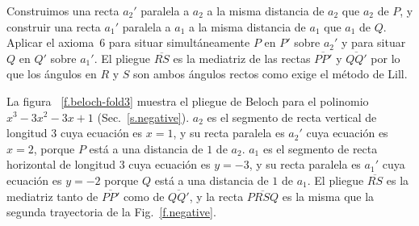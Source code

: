 Construimos una recta $a_2'$ paralela a $a_2$ a la misma distancia de $a_2$ que $a_2$ de $P$, y construir una recta $a_1'$ paralela a $a_1$ a la misma distancia de $a_1$ que $a_1$ de $Q$. Aplicar el axioma~6 para situar simultáneamente $P$ en $P'$ sobre $a_2'$ y para situar $Q$ en $Q'$ sobre $a_1'$. El pliegue $\overline{RS}$ es la mediatriz de las rectas $\overline{PP'}$ y $\overline{QQ'}$ por lo que los ángulos en $R$ y $S$ son ambos ángulos rectos como exige el método de Lill.

La figura ~\ref{f.beloch-fold3} muestra el pliegue de Beloch para el polinomio $x^3-3x^2-3x+1$ (Sec.~\ref{s.negative}). $a_2$ es el segmento de recta vertical de longitud $3$ cuya ecuación es $x=1$, y su recta paralela es $a_2'$ cuya ecuación es $x=2$, porque $P$ está a una distancia de $1$ de $a_2$. $a_1$ es el segmento de recta horizontal de longitud $3$ cuya ecuación es $y=-3$, y su recta paralela es $a_1'$ cuya ecuación es $y=-2$ porque $Q$ está a una distancia de $1$ de $a_1$. El pliegue $\overline{RS}$ es la mediatriz tanto de $\overline{PP'}$ como de $\overline{QQ'}$, y la recta $\overline{PRSQ}$ es la misma que la segunda trayectoria de la Fig.~\ref{f.negative}.


